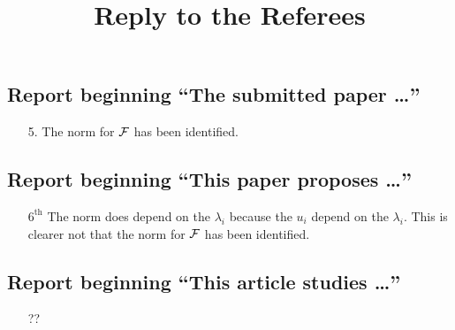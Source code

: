 \documentclass[letter]{article}
\begin{document}
\title{Reply to the Referees}
\maketitle



\subsection*{Report beginning ``The submitted paper \ldots''}

\begin{enumerate}
    \item[5.] The norm for ${\mathcal{F}}$ has been identified.
\end{enumerate}


\subsection*{Report beginning ``This paper proposes \ldots''}

\begin{enumerate}[labelwidth = 10ex]
    \item[$6^{\text{th}}$ \bullet] The norm does depend on the $\lambda_i$ because the $u_i$ depend on the $\lambda_i$.  This is clearer not that the norm for ${\mathcal{F}}$ has been identified.
\end{enumerate}


\subsection*{Report beginning ``This article studies \ldots''}

\begin{enumerate}
    \item[??] 
\end{enumerate}
\end{document}
